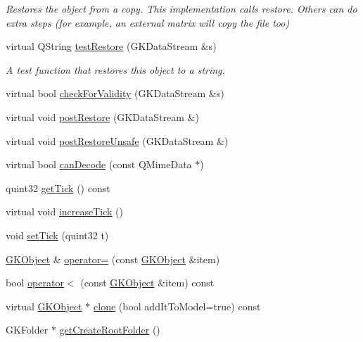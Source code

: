 \begin{DoxyCompactItemize}
\begin{DoxyCompactList}\small\item\em Restores the object from a copy. This implementation calls restore. Others can do extra steps (for example, an external matrix will copy the file too) \end{DoxyCompactList}\item 
virtual Q\+String \hyperlink{classGKObject_a448719529af8ce2ac16209f3ba1472d2}{test\+Restore} (G\+K\+Data\+Stream \&s)\hypertarget{classGKObject_a448719529af8ce2ac16209f3ba1472d2}{}\label{classGKObject_a448719529af8ce2ac16209f3ba1472d2}

\begin{DoxyCompactList}\small\item\em A test function that restores this object to a string. \end{DoxyCompactList}\item 
virtual bool \hyperlink{classGKObject_afd278ae77f692983059e45391532b9d3}{check\+For\+Validity} (G\+K\+Data\+Stream \&s)
\item 
virtual void \hyperlink{classGKObject_a443757bcfd3dee1826155a3f89497c8e}{post\+Restore} (G\+K\+Data\+Stream \&)
\item 
virtual void \hyperlink{classGKObject_a346bb3a641dcb5b5dc2b4880f9db2fc0}{post\+Restore\+Unsafe} (G\+K\+Data\+Stream \&)
\item 
virtual bool \hyperlink{classGKObject_a273a3ce4b93e48816f1223da4d10e3ea}{can\+Decode} (const Q\+Mime\+Data $\ast$)
\item 
quint32 \hyperlink{classGKObject_a160a938613052ed297caa8ae3ded57cf}{get\+Tick} () const 
\item 
virtual void \hyperlink{classGKObject_aa021efb86f83770079d8f10f4cf67b99}{increase\+Tick} ()
\item 
void \hyperlink{classGKObject_a8ae4a2e273c269e00bd993f378b78e8e}{set\+Tick} (quint32 t)
\item 
\hyperlink{classGKObject}{G\+K\+Object} \& \hyperlink{classGKObject_a67f49064bb49dd5e683b593aea715e91}{operator=} (const \hyperlink{classGKObject}{G\+K\+Object} \&item)
\item 
bool \hyperlink{classGKObject_a6585152b7a3103309c3fd90a220b8ec5}{operator$<$} (const \hyperlink{classGKObject}{G\+K\+Object} \&item) const 
\item 
virtual \hyperlink{classGKObject}{G\+K\+Object} $\ast$ \hyperlink{classGKObject_a0b70f4563bd69f3a4ff5d5a893b4e221}{clone} (bool add\+It\+To\+Model=true) const 
\item 
G\+K\+Folder $\ast$ \hyperlink{classGKObject_abdb8fcf05d860a385f77ce7ae880e705}{get\+Create\+Root\+Folder} ()\hypertarget{classGKObject_abdb8fcf05d860a385f77ce7ae880e705}{}\label{classGKObject_abdb8fcf05d860a385f77ce7ae880e705}


\end{DoxyCompactItemize}
